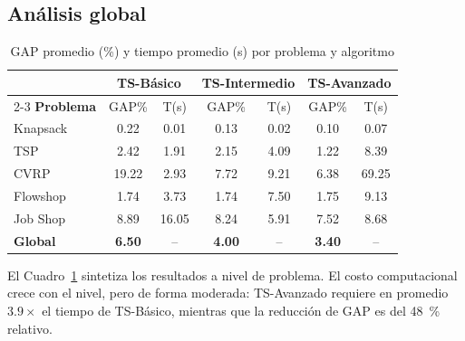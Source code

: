 \subsection{Análisis global}

\begin{table}[tb]
\caption{GAP promedio (\%) y tiempo promedio (s) por problema y algoritmo}
\label{tab:consolidada}
\centering
\footnotesize
\setlength{\tabcolsep}{4pt}
\begin{tabular}{lcccccc}
\toprule
 & \multicolumn{2}{c}{\textbf{TS-Básico}}
 & \multicolumn{2}{c}{\textbf{TS-Intermedio}}
 & \multicolumn{2}{c}{\textbf{TS-Avanzado}} \\
\cmidrule{2-3}\cmidrule{4-5}\cmidrule{6-7}
\textbf{Problema} & GAP\% & T(s) & GAP\% & T(s) & GAP\% & T(s) \\
\midrule
Knapsack    & 0.22  & 0.01  & 0.13  & 0.02  & 0.10  & 0.07  \\
TSP         & 2.42  & 1.91  & 2.15  & 4.09  & 1.22  & 8.39  \\
CVRP        & 19.22  & 2.93  & 7.72  & 9.21  & 6.38  & 69.25  \\
Flowshop    & 1.74  & 3.73  & 1.74  & 7.50  & 1.75  & 9.13  \\
Job Shop    & 8.89  & 16.05  & 8.24  & 5.91  & 7.52  & 8.68  \\
\midrule
\textbf{Global} & \textbf{6.50} & -- & \textbf{4.00} & -- & \textbf{3.40} & -- \\
\bottomrule
\end{tabular}
\end{table}

El Cuadro~\ref{tab:consolidada} sintetiza los resultados a nivel de problema.
El costo computacional crece con el nivel, pero de forma moderada:
TS-Avanzado requiere en promedio $3.9\times$ el tiempo de TS-Básico,
mientras que la reducción de GAP es del \SI{48}{\percent} relativo.
